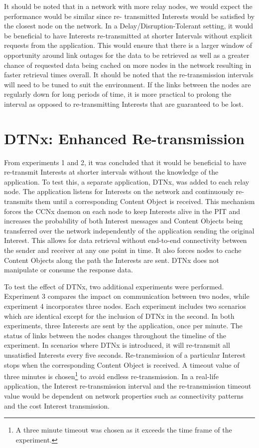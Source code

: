 \documentclass[a4paper,12pt]{report}      %
\begin{document}
It should be noted that in a network with more relay nodes, we would expect the performance would be similar since re-
transmitted Interests would be satisfied by the closest node on the network. In a Delay/Disruption-Tolerant setting,
it would be beneficial to have Interests re-transmitted at shorter Intervals without explicit requests from
the application. This would ensure that there is a larger window of opportunity around link outages for
the data to be retrieved as well as a greater chance of requested data being cached on more nodes in the
network resulting in faster retrieval times overall. It should be noted that the re-transmission intervals
will need to be tuned to suit the environment. If the links between the nodes are regularly down for long
periods of time, it is more practical to prolong the interval as opposed to re-transmitting Interests that are
guaranteed to be lost.


\pagebreak
\section{DTNx: Enhanced Re-transmission}

From experiments 1 and 2, it was concluded that it would be beneficial to have re-transmit Interests at
shorter intervals without the knowledge of the application. To test this, a separate application, DTNx,
was added to each relay node. The application listens for Interests on the network and continuously re-transmits them until
a corresponding Content Object is received. This mechanism forces the CCNx daemon on each node to keep Interests alive in the PIT 
and increases the probability of both Interest messages and Content Objects being transferred over the network independently of the application sending the original Interest. This allows for data retrieval without end-to-end connectivity between the sender and receiver at any one point in time. It also forces nodes to cache Content Objects along the path the Interests  are sent. DTNx does not manipulate or consume the response data.

To test the effect of DTNx, two additional experiments were performed. Experiment 3 compares the
impact on communication between two nodes, while experiment 4 incorporates three nodes. Each
experiment includes two scenarios which are identical except for the inclusion of DTNx in the second.
In both experiments, three Interests are sent by the application, once per minute. The status of links
between the nodes changes throughout the timeline of the experiment. In scenarios where DTNx is
introduced, it will re-transmit all unsatisfied Interests every five seconds. Re-transmission of a particular
Interest stops when the corresponding Content Object is received. A timeout value of 
three minutes is chosen\footnote{A three minute timeout was chosen as it exceeds the time frame of the experiment.} to avoid endless re-transmission. In a real-life application, the Interest re-transmission interval and the re-transmission timeout value would be dependent on network properties such as connectivity patterns and the cost Interest transmission.
\end{document}
